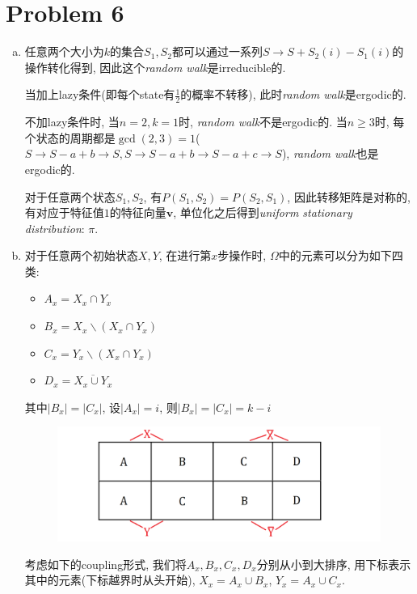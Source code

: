 \documentclass[paper=a4, fontsize=11pt]{scrartcl} %
\numberwithin{figure}{section} %
\numberwithin{table}{section} %
\begin{document}
\section*{Problem 6}
\begin{enumerate}[(a)]
\item

	任意两个大小为$k$的集合$S_1, S_2$都可以通过一系列$S\rightarrow S+S_2(i)-S_1(i)$的操作转化得到, 因此这个\textit{random walk}是irreducible的.

	当加上lazy条件(即每个state有$\frac{1}{2}$的概率不转移), 此时\textit{random walk}是ergodic的.

	不加lazy条件时, 当$n = 2, k = 1$时, \textit{random walk}不是ergodic的. 当$n \geq 3$时, 每个状态的周期都是$\gcd(2, 3) = 1$($S\rightarrow S-a+b \rightarrow S, S\rightarrow S-a+b \rightarrow S-a+c \rightarrow S$), \textit{random walk}也是ergodic的.

	对于任意两个状态$S_1, S_2$, 有$P(S_1, S_2) = P(S_2, S_1)$, 因此转移矩阵是对称的, 有对应于特征值$1$的特征向量$\mathbf{v}$, 单位化之后得到\textit{uniform stationary distribution}: $\pi$.
\item
	对于任意两个初始状态$X, Y$, 在进行第$x$步操作时, $\Omega$中的元素可以分为如下四类:
	\begin{itemize}
		\item $A_x = X_x\cap Y_x$
		\item $B_x = X_x\backslash \left(X_x\cap Y_x\right)$
		\item $C_x = Y_x\backslash \left(X_x\cap Y_x\right)$
		\item $D_x = \overline{X_x\cup Y_x}$
	\end{itemize}

	其中$|B_x| = |C_x|$, 设$|A_x| = i$, 则$|B_x| = |C_x| = k - i$ 
	
	\begin{figure}[!htb]
	\centering
	\includegraphics[width=140mm]{pic1.png}
	\end{figure}
	
	考虑如下的coupling形式, 我们将$A_x, B_x, C_x, D_x$分别从小到大排序, 用下标表示其中的元素(下标越界时从头开始), $X_x = A_x \cup B_x$, $Y_x = A_x \cup C_x$.


\end{enumerate}
\end{document}
